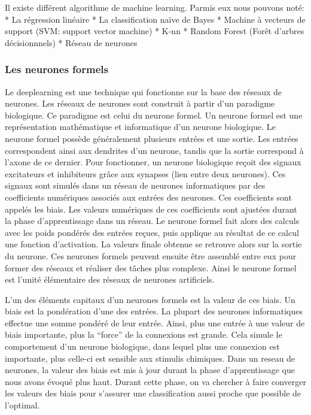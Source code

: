 \documentclass[a4paper,10pt,openany,oneside]{sphinxmanual}
\begin{document}
Il existe différent algorithme de machine learning. Parmis eux nous pouvons noté:
* La régression linéaire
* La classification naïve de Bayes
* Machine à vecteurs de support (SVM: support vector machine)
* K-nn
* Random Forest (Forêt d'arbres décisionnnels)
* Réseau de neurones


\subsubsection{Les neurones formels}
\label{index:les-neurones-formels}
Le deeplearning est une technique qui fonctionne sur la base des réseaux de neurones. Les réseaux de neurones sont construit à partir d'un
paradigme biologique. Ce paradigme est celui du neurone formel. Un neurone formel est une représentation mathématique et informatique d'un
neurone biologique. Le neurone formel possède généralement plusieurs entrées et une sortie. Les entrées correspondent ainsi aux dendrites
d'un neurone, tandis que la sortie correspond à l'axone de ce dernier. Pour fonctionner, un neurone biologique reçoit des signaux
excitateurs et inhibiteurs grâce aux synapses (lien entre deux neurones). Ces signaux sont simulés dans un réseau de neurones informatiques
par des coefficients numériques associés aux entrées des neurones. Ces coefficients sont appelés les biais. Les valeurs numériques de ces
coefficients sont ajustées durant la phase d'apprentissage dans un réseau. Le neurone formel fait alors des calculs avec les poids pondérés
des entrées reçues, puis applique au résultat de ce calcul une fonction d'activation. La valeurs finale obtenue se retrouve alors sur la
sortie du neurone. Ces neurones formels peuvent ensuite être assemblé entre eux pour former des réseaux et réaliser des tâches plus
complexe. Ainsi le neurone formel est l'unité élémentaire des réseaux de neurones artificiels.

L'un des éléments capitaux d'un neurones formels est la valeur de ces biais. Un biais est la pondération d'une des entrées. La plupart des
neurones informatiques effectue une somme pondéré de leur entrée. Ainsi, plus une entrée à une valeur de biais importante, plus la ``force''
de la connexions est grande. Cela simule le comportement d'un neurone biologique, dans lequel plus une connexion est importante, plus
celle-ci est sensible aux stimulis chimiques. Dans un reseau de neurones, la valeur des biais est mis à jour durant la phase d'apprentissage
que nous avons évoqué plus haut. Durant cette phase, on va chercher à faire converger les valeurs des biais pour s'assurer une classification
aussi proche que possible de l'optimal.
\end{document}
